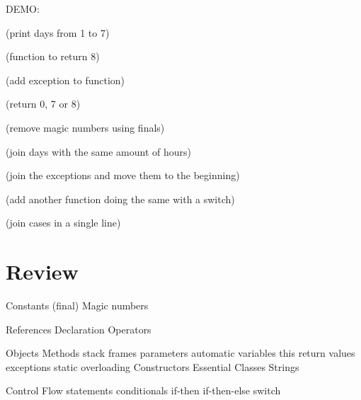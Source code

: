 \documentclass[a4paper, 9pt]{extarticle}
\begin{document}
DEMO:

(print days from 1 to 7)

(function to return 8)

(add exception to function)

(return 0, 7 or 8)

(remove magic numbers using finals)

(join days with the same amount of hours)

(join the exceptions and move them to the beginning)

(add another function doing the same with a switch)

(join cases in a single line)


\section{Review}

\begin{blackboard}
Constants (final)
  Magic numbers

References
  Declaration
  Operators

Objects
  Methods
    stack frames
    parameters
      automatic variables
      this
    return values
    exceptions
    static
    overloading
  Constructors
  Essential Classes
    Strings

Control Flow statements
  conditionals
    if-then
      if-then-else
    switch
\end{blackboard}
\end{document}
